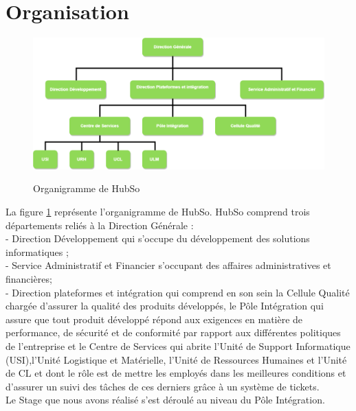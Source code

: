 \section{Organisation}
\begin{figure}[h!]
	\centering
	\begin{minipage}{12cm}
		\centering
		{\includegraphics[height=0.27\textheight]{fig/Organnigramme-HubSo.png}}
	\end{minipage}
 	\caption{Organigramme de HubSo}
 	\label{fig:1.1}
\end{figure}
La figure \ref{fig:1.1} représente l'organigramme de HubSo. HubSo comprend trois départements reliés à la Direction Générale : \\
- Direction Développement qui s'occupe du développement des solutions informatiques ; \\
- Service Administratif et Financier s'occupant des affaires administratives et financières;\\
- Direction plateformes et intégration qui comprend en son sein la Cellule Qualité chargée d'assurer la qualité des produits développés, le Pôle Intégration qui assure que tout produit développé répond aux exigences en matière de performance, de sécurité et de conformité par rapport aux différentes politiques de l'entreprise et le Centre de Services qui abrite l'Unité de Support Informatique (USI),l'Unité Logistique et Matérielle, l'Unité de Ressources Humaines et l'Unité de CL et dont le rôle est de mettre les employés dans les meilleures conditions et d'assurer un suivi des tâches de ces derniers grâce à un système de tickets.\\
Le Stage que nous avons réalisé s'est déroulé au niveau du Pôle Intégration.
\clearpage